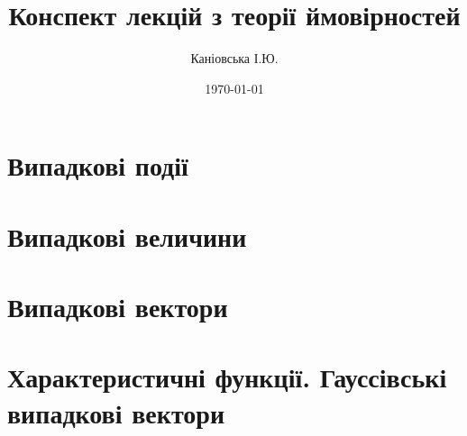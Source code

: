 \documentclass{report}
\author{Каніовська І.Ю.}
\title{Конспект лекцій з теорії ймовірностей}
\date{\today}
\begin{document}
 
    \maketitle
    \tableofcontents
    \chapter{Випадкові події}
        
        
        
        
    \chapter{Випадкові величини}
        
        
        
    \chapter{Випадкові вектори}
        
        
        
        
    \chapter{Характеристичні функції. Гауссівські випадкові вектори}
        
        
\end{document}
